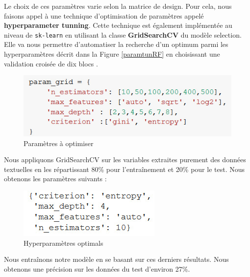 \documentclass[11pt]{article}
\begin{document}
Le choix de ces paramètres varie selon la matrice de design. 
Pour cela, nous faisons appel à une technique d'optimisation de paramètres appelé \textbf{hyperparameter tunning}.
Cette technique est également implémentée au niveau de \texttt{sk-learn} en utilisant la classe \textbf{GridSearchCV} du modèle selection.
Elle va nous permettre d'automatiser la recherche d'un optimum parmi les hyperparamètres décrit dans la Figure \autoref{paramtunRF} en choisissant une validation croisée de dix blocs .\par
{}

\begin{figure}[hbt!]
    \centering
    \includegraphics[width= 11 cm]{figures/paramtunRF.jpeg}
    \caption{Paramètres à optimiser}
    \label{paramtunRF}
\end{figure}
\FloatBarrier

Nous appliquons GridSearchCV sur les variables extraites purement des données textuelles en les répartissant 80\% pour l’entraînement et 20\% pour le test. Nous obtenons les paramètres suivants :

\begin{figure}[hbt!]
    \centering
    \includegraphics[width = 7 cm]{./figures/outputCVRF.jpeg}
    \caption{Hyperparamètres optimals}
    \label{CV1}
\end{figure}
\FloatBarrier

Nous entraînons notre modèle en se basant sur ces derniers résultats. Nous obtenons une précision sur les données du test d'environ 27\%.
\end{document}
